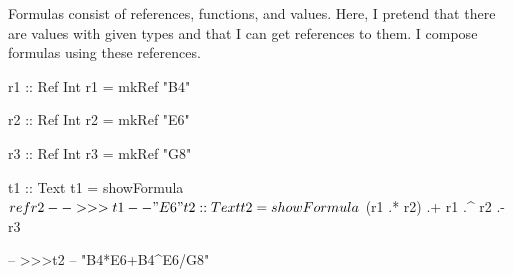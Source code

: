 Formulas consist of references, functions, and values.
Here, I pretend that there are values with given types and that I can get references to them. I compose formulas using these references.

\begin{mycode}
r1 :: Ref Int
r1 = mkRef "B4"

r2 :: Ref Int
r2 = mkRef "E6"

r3 :: Ref Int
r3 = mkRef "G8"

t1 :: Text
t1 = showFormula $ ref r2

-- >>>t1
-- "E6"

t2 :: Text
t2 = showFormula $ (r1 .* r2) .+ r1 .^ r2 .- r3

-- >>>t2
-- "B4*E6+B4^E6/G8"
\end{mycode}
